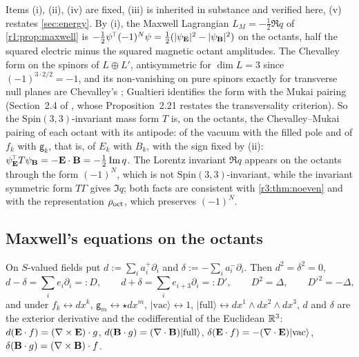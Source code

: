 Items (i), (ii), (iv) are fixed, (iii) is inherited in substance and verified here, (v) restates \cref{sec:energy}. By (i), the Maxwell
Lagrangian $L_M=-\tfrac12\Re q$ of \cref{r1:prop:maxwell} is $-\tfrac12\psi^{\!\top}(-1)^N\psi=\tfrac12(|\psi_{\mathbf E}|^2-|\psi_{\mathbf B}|^2)$ on the octants, half the
squared electric minus the squared magnetic octant amplitudes. The Chevalley form on the spinors
of $L\oplus L'$, antisymmetric for $\dim L=3$ since $(-1)^{3\cdot2/2}=-1$, and its non-vanishing on pure spinors exactly for transverse null
planes are Chevalley's \cite{Chevalley54}; Gualtieri identifies the form with the Mukai pairing (Section~2.4 of \cite{Gualtieri03}, whose
Proposition~2.21 restates the transversality criterion). So the Spin$(3,3)$-invariant mass form $T$ is, on the octants, the Chevalley--Mukai pairing of each octant with its
antipode: of the vacuum with the filled pole and of $f_k$ with $\mathsf g_k$, that is, of $E_k$ with $B_k$, with the sign fixed by (ii):
$\psi_{\mathbf E}^{\!\top}T\psi_{\mathbf B}=-\mathbf E\cdot\mathbf B=-\tfrac12\operatorname{Im} q$. The Lorentz invariant $\Re q$ appears on
the octants through the form $(-1)^N$, which is not $\mathrm{Spin}(3,3)$-invariant, while the invariant symmetric form $T\Gamma$ gives $\Im q$;
both facts are consistent with \cref{r3:thm:noeven} and with the representation $\rho_{\rm oct}$, which preserves $(-1)^N$.

\subsection{Maxwell's equations on the octants}
\label{r3:sec:maxwell}

\begin{proposition}
\label{r3:prop:dk}
On $S$-valued fields put $d:=\sum_ia^+_i\partial_i$ and $\delta:=-\sum_ia^-_i\partial_i$. Then $d^2=\delta^2=0$,
\[
d-\delta=\sum_ie_i\partial_i=:D,\qquad d+\delta=\sum_ie_{i+3}\partial_i=:D',\qquad D^2=\Delta,\qquad D'^2=-\Delta,
\]
and under $f_k\leftrightarrow dx^k$, $\mathsf g_m\leftrightarrow\star dx^m$, $|\mathrm{vac}\rangle\leftrightarrow1$, $|\mathrm{full}\rangle\leftrightarrow dx^1\wedge dx^2\wedge dx^3$, $d$ and $\delta$
are the exterior derivative and the codifferential of the Euclidean $\mathbb{R}^3$: $d(\mathbf E\cdot f)=(\nabla\times\mathbf E)\cdot g$, $d(\mathbf B\cdot g)=(\nabla\cdot\mathbf B)|\mathrm{full}\rangle$,
$\delta(\mathbf E\cdot f)=-(\nabla\cdot\mathbf E)|\mathrm{vac}\rangle$, $\delta(\mathbf B\cdot g)=(\nabla\times\mathbf B)\cdot f$.
\end{proposition}

